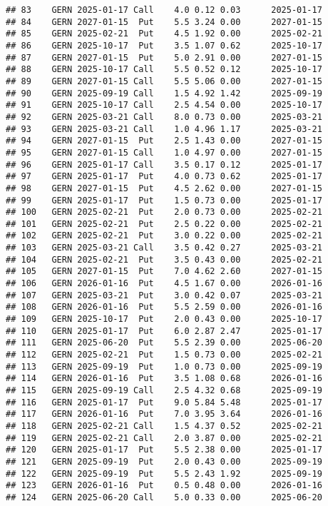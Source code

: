 \documentclass[
]{article}
\begin{document}
\begin{verbatim}
## 83    GERN 2025-01-17 Call    4.0 0.12 0.03      2025-01-17
## 84    GERN 2027-01-15  Put    5.5 3.24 0.00      2027-01-15
## 85    GERN 2025-02-21  Put    4.5 1.92 0.00      2025-02-21
## 86    GERN 2025-10-17  Put    3.5 1.07 0.62      2025-10-17
## 87    GERN 2027-01-15  Put    5.0 2.91 0.00      2027-01-15
## 88    GERN 2025-10-17 Call    5.5 0.52 0.12      2025-10-17
## 89    GERN 2027-01-15 Call    5.5 5.06 0.00      2027-01-15
## 90    GERN 2025-09-19 Call    1.5 4.92 1.42      2025-09-19
## 91    GERN 2025-10-17 Call    2.5 4.54 0.00      2025-10-17
## 92    GERN 2025-03-21 Call    8.0 0.73 0.00      2025-03-21
## 93    GERN 2025-03-21 Call    1.0 4.96 1.17      2025-03-21
## 94    GERN 2027-01-15  Put    2.5 1.43 0.00      2027-01-15
## 95    GERN 2027-01-15 Call    1.0 4.97 0.00      2027-01-15
## 96    GERN 2025-01-17 Call    3.5 0.17 0.12      2025-01-17
## 97    GERN 2025-01-17  Put    4.0 0.73 0.62      2025-01-17
## 98    GERN 2027-01-15  Put    4.5 2.62 0.00      2027-01-15
## 99    GERN 2025-01-17  Put    1.5 0.73 0.00      2025-01-17
## 100   GERN 2025-02-21  Put    2.0 0.73 0.00      2025-02-21
## 101   GERN 2025-02-21  Put    2.5 0.22 0.00      2025-02-21
## 102   GERN 2025-02-21  Put    3.0 0.22 0.00      2025-02-21
## 103   GERN 2025-03-21 Call    3.5 0.42 0.27      2025-03-21
## 104   GERN 2025-02-21  Put    3.5 0.43 0.00      2025-02-21
## 105   GERN 2027-01-15  Put    7.0 4.62 2.60      2027-01-15
## 106   GERN 2026-01-16  Put    4.5 1.67 0.00      2026-01-16
## 107   GERN 2025-03-21  Put    3.0 0.42 0.07      2025-03-21
## 108   GERN 2026-01-16  Put    5.5 2.59 0.00      2026-01-16
## 109   GERN 2025-10-17  Put    2.0 0.43 0.00      2025-10-17
## 110   GERN 2025-01-17  Put    6.0 2.87 2.47      2025-01-17
## 111   GERN 2025-06-20  Put    5.5 2.39 0.00      2025-06-20
## 112   GERN 2025-02-21  Put    1.5 0.73 0.00      2025-02-21
## 113   GERN 2025-09-19  Put    1.0 0.73 0.00      2025-09-19
## 114   GERN 2026-01-16  Put    3.5 1.08 0.68      2026-01-16
## 115   GERN 2025-09-19 Call    2.5 4.32 0.68      2025-09-19
## 116   GERN 2025-01-17  Put    9.0 5.84 5.48      2025-01-17
## 117   GERN 2026-01-16  Put    7.0 3.95 3.64      2026-01-16
## 118   GERN 2025-02-21 Call    1.5 4.37 0.52      2025-02-21
## 119   GERN 2025-02-21 Call    2.0 3.87 0.00      2025-02-21
## 120   GERN 2025-01-17  Put    5.5 2.38 0.00      2025-01-17
## 121   GERN 2025-09-19  Put    2.0 0.43 0.00      2025-09-19
## 122   GERN 2025-09-19  Put    5.5 2.43 1.92      2025-09-19
## 123   GERN 2026-01-16  Put    0.5 0.48 0.00      2026-01-16
## 124   GERN 2025-06-20 Call    5.0 0.33 0.00      2025-06-20

\end{verbatim}
\end{document}
